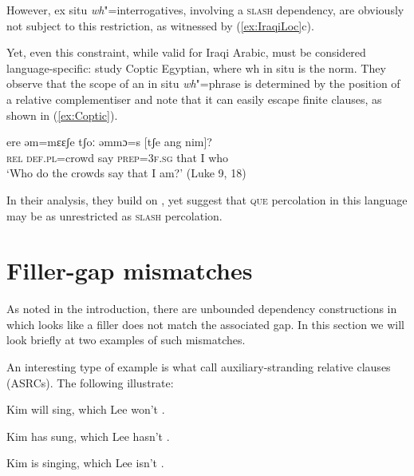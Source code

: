 \documentclass[output=paper
                ,modfonts
                ,nonflat
	        ,collection
	        ,collectionchapter
	        ,collectiontoclongg
 	        ,biblatex
                ,babelshorthands
                ,newtxmath
                ,draftmode
                ,colorlinks, citecolor=brown
]{./langsci/langscibook}
\begin{document}
{\begin{exe}
\end{exe}

\noindent
However, ex situ \emph{wh}"=interrogatives, involving a \textsc{slash} dependency, are obviously not subject to this restriction, as witnessed by (\ref{ex:IraqiLoc}c).  

Yet, even this constraint, while valid for Iraqi Arabic, must be considered language-specific: \citet{Crysmann:Reintges:14} study Coptic Egyptian, where wh in situ is the norm. They observe that the scope of an in situ \emph{wh}"=phrase is determined by the position of a relative complementiser and note that it can easily escape finite clauses, as shown in (\ref{ex:Coptic}). 

\begin{exe}
  \ex \gll ere əm=mɛɛʃe tʃoː əmmɔ=s [tʃe ang nim]?\\
  \textsc{rel} \textsc{def.pl}=crowd say \textsc{prep=3f.sg} \spacebr{}that I who\\
  \glt `Who do the crowds say that I am?'  (Luke 9, 18) \label{ex:Coptic}
\end{exe}

\noindent
In their analysis, they build on \citet{Johnson:Lappin:97}, yet suggest that \textsc{que} percolation in this language may be as unrestricted as \textsc{slash} percolation.




\section{Filler-gap mismatches}
\label{sec:UDC:FillerGapMismatches}

As noted in the introduction, there are unbounded dependency
constructions in which looks like a filler does not match the associated
gap. In this section we will look briefly at two examples of such
mismatches.

An interesting type of example is what \citet{Arnold:Borsley:10} call
auxiliary-stranding relative clauses (ASRCs). The following
illustrate:

\begin{exe}
  \ex \label{ex:UDC:ASRC}
  \begin{xlist}
    \ex Kim will sing, which Lee won't \gap{}.
    
    \ex Kim has sung, which Lee hasn't \gap{}.
    
    \ex Kim is singing, which Lee isn't \gap{}.
    

\end{xlist}
\end{exe}}
\end{document}

